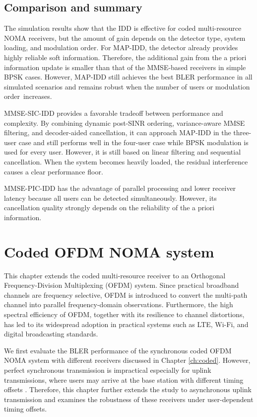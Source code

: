 \section{Comparison and summary}

The simulation results show that the IDD is effective for coded multi-resource NOMA receivers, but the amount of gain depends on the detector type, system loading, and modulation order. For MAP-IDD, the detector already provides highly reliable soft information. Therefore, the additional gain from the a priori information update is smaller than that of the MMSE-based receivers in simple BPSK cases. However, MAP-IDD still achieves the best BLER performance in all simulated scenarios and remains robust when the number of users or modulation order~increases.

MMSE-SIC-IDD provides a favorable tradeoff between performance and complexity. By combining dynamic post-SINR ordering, variance-aware MMSE filtering, and decoder-aided cancellation, it can approach MAP-IDD in the three-user case and still performs well in the four-user case while BPSK modulation is used for every user. However, it is still based on linear filtering and sequential cancellation. When the system becomes heavily loaded, the  residual interference causes a clear performance floor.

MMSE-PIC-IDD has the advantage of parallel processing and lower receiver latency because all users can be detected simultaneously. However, its cancellation quality strongly depends on the reliability of the a priori information.




\chapter{Coded OFDM NOMA system}
\label{ch:ofdm}

This chapter extends the coded multi-resource receiver to an Orthogonal Frequency-Division Multiplexing (OFDM) system. Since practical broadband channels are frequency selective, OFDM is introduced to convert the multi-path channel into parallel frequency-domain observations. Furthermore, the high spectral efficiency of OFDM, together with its resilience to channel distortions, has led to its widespread adoption in practical systems such as LTE, Wi-Fi, and digital broadcasting standards.

We first evaluate the BLER performance of the synchronous coded OFDM NOMA system with different receivers discussed in Chapter \ref{ch:coded}. However, perfect synchronous transmission is impractical especially for uplink transmissions, where users may arrive at the base station with different timing offsets \cite{haci2017performance}. Therefore, this chapter further extends the study to asynchronous uplink transmission and examines the robustness of these receivers under user-dependent timing offsets.

